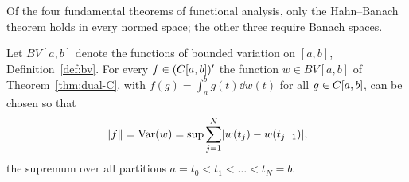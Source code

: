 %
%

\begin{remark}
Of the four fundamental theorems of functional analysis, only the
Hahn--Banach theorem holds in every normed space; the other three require
Banach spaces.
\end{remark}

\begin{proposition}\label{prop:dual-C-norm}
Let $BV[a,b]$ denote the functions of bounded variation on $[a,b]$,
Definition~\ref{def:bv}. For every $f \in (C[a,b])'$ the function
$w \in BV[a,b]$ of Theorem~\ref{thm:dual-C}, with
$f(g) = \int_a^b g(t) \dd w(t)$ for all $g \in C[a,b]$, can be chosen so
that
\[
  \lVert f\rVert = \operatorname{Var}(w)
  = \sup \sum_{j=1}^{N} \lvert w(t_j) - w(t_{j-1})\rvert ,
\]
the supremum over all partitions $a = t_0 < t_1 < \dots < t_N = b$.
\end{proposition}

